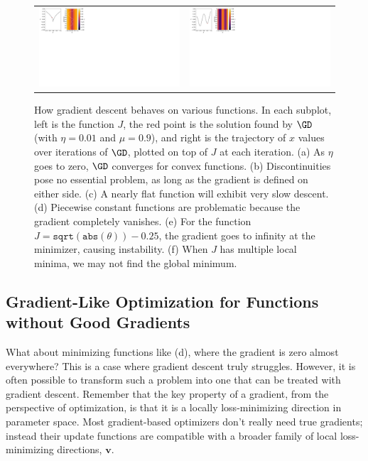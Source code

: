 \begin{figure}[h!]
{\begin{tabular}{cc}
        \includegraphics[width=0.5\linewidth]{./figures/gradient_descent/grad_descent_ex5.pdf} & \includegraphics[width=0.5\linewidth]{./figures/gradient_descent/grad_descent_ex6.pdf}
    \end{tabular}
    }
    \caption{How gradient descent behaves on various functions. In each subplot, left is the function $J$, the red point is the solution found by $\GD$ (with $\eta=0.01$ and $\mu=0.9$), and right is the trajectory of $x$ values over iterations of $\GD$, plotted on top of $J$ at each iteration. (a) As $\eta$ goes to zero, $\GD$ converges for convex functions. (b) Discontinuities pose no essential problem, as long as the gradient is defined on either side. (c) A nearly flat function will exhibit very slow descent. (d) Piecewise constant functions are problematic because the gradient completely vanishes. (e) For the function $J=\texttt{sqrt}(\texttt{abs}(\theta))-0.25$, the gradient goes to infinity at the minimizer, causing instability. (f) When $J$ has multiple local minima, we may not find the global minimum.}
    \label{fig:gradient_descent:grad_descent_simple_examples}
\end{figure}


\subsection{Gradient-Like Optimization for Functions without Good Gradients}\label{sec:gradient_descent:zeroth_order}
What about minimizing functions like \fig{\ref{fig:gradient_descent:grad_descent_simple_examples}}(d), where the gradient is zero almost everywhere? This is a case where gradient descent truly struggles. However, it is often possible to transform such a problem into one that can be treated with gradient descent. Remember that the key property of a gradient, from the perspective of optimization, is that it is a locally loss-minimizing direction in parameter space. Most gradient-based optimizers don't really need true gradients; instead their update functions are compatible with a broader family of local loss-minimizing directions, $\mathbf{v}$. 

